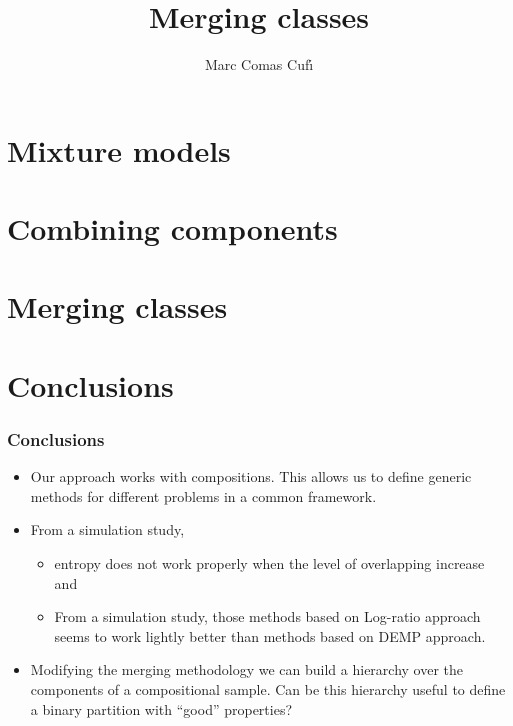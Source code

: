 \documentclass[10pt]{beamer}
\title{Merging classes}
\author{Marc Comas Cuf\'{\i}}
\date{}
\begin{document}
\begin{frame}
\titlepage
\end{frame}

\section{Mixture models}
\frame{\sectionpage}



\section{Combining components}
\frame{\sectionpage}





\section{Merging classes}
\frame{\sectionpage}



\section{Conclusions}
\begin{frame}
\frametitle{Conclusions}
\begin{itemize}
\item Our approach works with compositions. This allows us to define generic methods for different problems in a common framework.
\item From a simulation study, 
\begin{itemize}
\item entropy does not work properly when the level of overlapping increase and
\item From a simulation study, those methods based on Log-ratio approach seems to work lightly better than methods based on DEMP approach.
\end{itemize}
\item Modifying the merging methodology we can build a hierarchy over the components of a compositional sample. Can be this hierarchy useful to define a binary partition with ``good'' properties? 
\end{itemize}

\end{frame}
\end{document}
